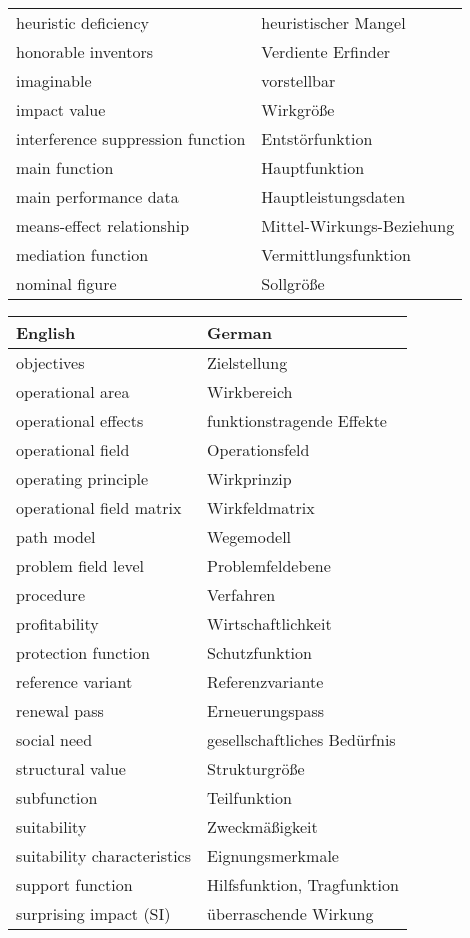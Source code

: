 \documentclass[11pt,a4paper]{article}
\begin{document}
\begin{center}
\begin{tabular}{l|l}
    heuristic deficiency & heuristischer Mangel\\
    honorable inventors & Verdiente Erfinder\\
    imaginable & vorstellbar \\
    impact value & Wirkgröße \\
    interference suppression function & Entstörfunktion \\
    main function & Hauptfunktion \\
    main performance data & Hauptleistungsdaten \\
    means-effect relationship & Mittel-Wirkungs-Beziehung \\
    mediation function & Vermittlungsfunktion \\
    nominal figure & Sollgröße \\
  \end{tabular}
  \begin{tabular}{l|l}
    English & German \\\hline
    objectives & Zielstellung \\
    operational area & Wirkbereich\\
    operational effects & funktionstragende Effekte\\
    operational field & Operationsfeld \\
    operating principle & Wirkprinzip\\
    operational field matrix & Wirkfeldmatrix\\
    path model & Wegemodell\\
    problem field level & Problemfeldebene \\
    procedure & Verfahren \\
    profitability & Wirtschaftlichkeit \\
    protection function & Schutzfunktion \\
    reference variant & Referenzvariante\\
    renewal pass & Erneuerungspass \\
    social need & gesellschaftliches Bedürfnis\\
    structural value & Strukturgröße\\
    subfunction & Teilfunktion\\
    suitability & Zweckmäßigkeit\\
    suitability characteristics & Eignungsmerkmale\\
    support function & Hilfsfunktion, Tragfunktion \\
    surprising impact (SI) & überraschende Wirkung \\

\end{tabular}
\end{center}
\end{document}
